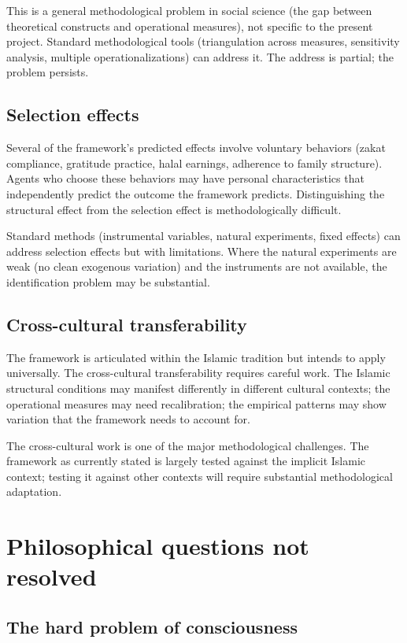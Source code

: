 This is a general methodological problem in social science (the
gap between theoretical constructs and operational measures), not
specific to the present project. Standard methodological tools
(triangulation across measures, sensitivity analysis, multiple
operationalizations) can address it. The address is partial; the
problem persists.

\subsection{Selection effects}

Several of the framework's predicted effects involve voluntary
behaviors (zakat compliance, gratitude practice, halal earnings,
adherence to family structure). Agents who choose these behaviors
may have personal characteristics that independently predict the
outcome the framework predicts. Distinguishing the structural
effect from the selection effect is methodologically difficult.

Standard methods (instrumental variables, natural experiments,
fixed effects) can address selection effects but with limitations.
Where the natural experiments are weak (no clean exogenous
variation) and the instruments are not available, the
identification problem may be substantial.

\subsection{Cross-cultural transferability}

The framework is articulated within the Islamic tradition but
intends to apply universally. The cross-cultural transferability
requires careful work. The Islamic structural conditions may
manifest differently in different cultural contexts; the
operational measures may need recalibration; the empirical
patterns may show variation that the framework needs to account
for.

The cross-cultural work is one of the major methodological
challenges. The framework as currently stated is largely tested
against the implicit Islamic context; testing it against other
contexts will require substantial methodological adaptation.

\section{Philosophical questions not resolved}
\label{sec:open-philosophical}

\subsection{The hard problem of consciousness}

